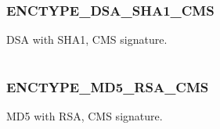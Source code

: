 \documentclass[letterpaper,10pt,english]{sphinxmanual}
\begin{document}
\begin{tabulary}{\linewidth}{|L|L|}
\hline

 & 
\\\hline
\end{tabulary}



\subsubsection{ENCTYPE\_DSA\_SHA1\_CMS}
\label{appdev/refs/macros/ENCTYPE_DSA_SHA1_CMS:enctype-dsa-sha1-cms-data}\label{appdev/refs/macros/ENCTYPE_DSA_SHA1_CMS:enctype-dsa-sha1-cms}\label{appdev/refs/macros/ENCTYPE_DSA_SHA1_CMS::doc}

\begin{fulllineitems}
\label{appdev/refs/macros/ENCTYPE_DSA_SHA1_CMS:ENCTYPE_DSA_SHA1_CMS}
\end{fulllineitems}


DSA with SHA1, CMS signature.

\begin{tabulary}{\linewidth}{|L|L|}
\hline

 & 
\\\hline
\end{tabulary}



\subsubsection{ENCTYPE\_MD5\_RSA\_CMS}
\label{appdev/refs/macros/ENCTYPE_MD5_RSA_CMS:enctype-md5-rsa-cms}\label{appdev/refs/macros/ENCTYPE_MD5_RSA_CMS:enctype-md5-rsa-cms-data}\label{appdev/refs/macros/ENCTYPE_MD5_RSA_CMS::doc}

\begin{fulllineitems}
\label{appdev/refs/macros/ENCTYPE_MD5_RSA_CMS:ENCTYPE_MD5_RSA_CMS}
\end{fulllineitems}


MD5 with RSA, CMS signature.

\begin{tabulary}{\linewidth}{|L|L|}
\hline

 & 
\\\hline
\end{tabulary}
\end{document}

